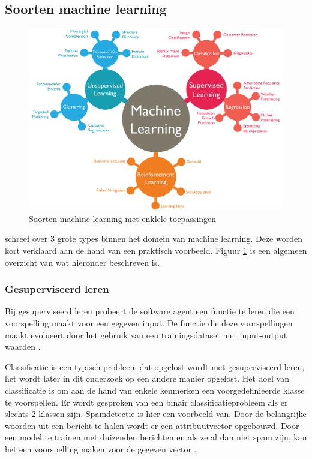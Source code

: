 \subsection{Soorten machine learning}
\label{subsec:soorten-machine-learning}

\begin{figure}
    \includegraphics[width=\linewidth]{img/ml-soorten.png}
    \caption{Soorten machine learning met enklele toepassingen \autocite{Arroyo2017}}
    \label{fig:ml-soorten}
\end{figure}

\textcite{Lievens2019} schreef over 3 grote types binnen het domein van machine learning. Deze worden kort verklaard aan de hand van een praktisch voorbeeld. Figuur \ref{fig:ml-soorten} is een algemeen overzicht van wat hieronder beschreven is.


\subsubsection{Gesuperviseerd leren}
\label{subsubsec:gesuperviseerd-leren}

Bij gesuperviseerd leren probeert de software agent een functie te leren die een voorspelling maakt voor een gegeven input. De functie die deze voorspellingen maakt evolueert door het gebruik van een trainingsdataset met input-output waarden \autocite{Norvig1994}.

Classificatie is een typisch probleem dat opgelost wordt met gesuperviseerd leren, het wordt later in dit onderzoek op een andere manier opgelost. Het doel van classificatie is om aan de hand van enkele kenmerken een voorgedefinieerde klasse te voorspellen. Er wordt gesproken van een binair classificatieprobleem als er slechts 2 klassen zijn. Spamdetectie is hier een voorbeeld van. Door de belangrijke woorden uit een bericht te halen wordt er een attribuutvector opgebouwd. Door een model te trainen met duizenden berichten en als ze al dan niet spam zijn, kan het een voorspelling maken voor de gegeven vector \autocite{Lievens2019}.

